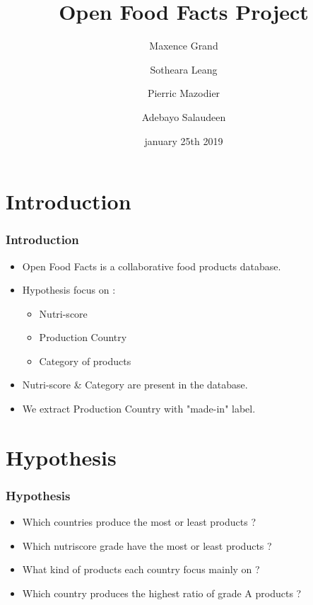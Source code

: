 \documentclass{beamer}
\begin{document}

\title{Open Food Facts Project}
\author{Maxence Grand \and Sotheara Leang \and Pierric Mazodier \and Adebayo Salaudeen } 
\date{january 25th 2019}

\maketitle

\section{Introduction}

\begin{frame}
  \frametitle{Introduction}
  \begin{itemize}
  \item Open Food Facts is a collaborative food products database.\pause
  \item Hypothesis focus on :
    \begin{itemize}[label=-]
      \item Nutri-score
      \item Production Country
      \item Category of products
    \end{itemize}\pause
    \item Nutri-score \& Category are present in the database.\pause
    \item We extract Production Country with "made-in" label.
  \end{itemize}
\end{frame}

\section{Hypothesis}

\begin{frame}
\frametitle{Hypothesis}
\begin{itemize}[label=$\square$]
    \item Which countries produce the most or least products ?\pause 
    \item Which nutriscore grade have the most or least products ?\pause
    \item What kind of products each country focus mainly on ?\pause
    \item Which country produces the highest ratio of grade A products ?  
\end{itemize}
\end{frame}
\end{document}
